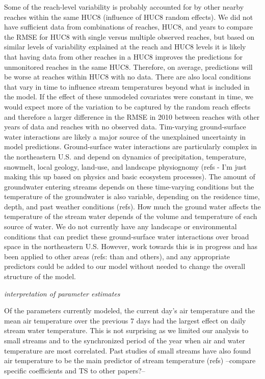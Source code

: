\documentclass[]{article}
\begin{document}
Some of the reach-level variability is probably accounted for by other
nearby reaches within the same HUC8 (influence of HUC8 random effects).
We did not have sufficient data from combinations of reaches, HUC8, and
years to compare the RMSE for HUC8 with single versus multiple observed
reaches, but based on similar levels of variability explained at the
reach and HUC8 levels it is likely that having data from other reaches
in a HUC8 improves the predictions for unmonitored reaches in the same
HUC8. Therefore, on average, predictions will be worse at reaches within
HUC8 with no data. There are also local conditions that vary in time to
influence stream temperatures beyond what is included in the model. If
the effect of these unmodeled covariates were constant in time, we would
expect more of the variation to be captured by the random reach effects
and therefore a larger difference in the RMSE in 2010 between reaches
with other years of data and reaches with no observed data. Tim-varying
ground-surface water interactions are likely a major source of the
unexplained uncertainty in model predictions. Ground-surface water
interactions are particularly complex in the northeastern U.S. and
depend on dynamics of precipitation, temperature, snowmelt, local
geology, land-use, and landscape physiognomy (refs - I'm just making
this up based on physics and basic ecosystem processes). The amount of
groundwater entering streams depends on these time-varying conditions
but the temperature of the groundwater is also variable, depending on
the residence time, depth, and past weather conditions (refs). How much
the ground water affects the temperature of the stream water depends of
the volume and temperature of each source of water. We do not currently
have any landscape or environmental conditions that can predict these
ground-surface water interactions over broad space in the northeastern
U.S. However, work towards this is in progress and has been applied to
other areas (refs: than and others), and any appropriate predictors
could be added to our model without needed to change the overall
structure of the model.

\emph{interpretation of parameter estimates}

Of the parameters currently modeled, the current day's air temperature
and the mean air temperature over the previous 7 days had the largest
effect on daily stream water temperature. This is not surprising as we
limited our analysis to small streams and to the synchronized period of
the year when air and water temperature are most correlated. Past
studies of small streams have also found air temperature to be the main
predictor of stream temperature (refs) --compare specific coefficients
and TS to other papers?--
\end{document}
